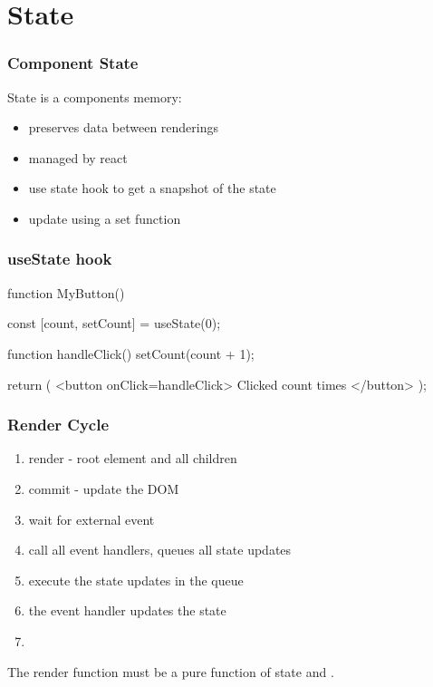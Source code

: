 \section{State}
\begin{frame}[fragile] \frametitle{Component State}
State is a components memory:
  \begin{itemize}
    \item preserves data between renderings
    \item managed by react
    \item use state hook to get a snapshot of the state
    \item update using a set function
  \end{itemize}
\end{frame}

\begin{frame}[fragile] \frametitle{useState hook}
\begin{CodeBox}{}
function MyButton() {
  const [count, setCount] = useState(0);

  function handleClick() {
    setCount(count + 1);
  }

  return (
    <button onClick={handleClick}>
      Clicked {count} times
    </button>
  );
}
\end{CodeBox}
\end{frame}

\begin{frame}[fragile] \frametitle{Render Cycle}
\begin{enumerate}
  \item render - root element and all children
  \item commit - update the DOM
  \item wait for external event
  \item call all event handlers, queues all state updates
  \item execute the state updates in the queue
  \item the event handler updates the state
  \item {}
\end{enumerate}
\vspace{5mm}The render function must be a pure function of state and .
\end{frame}

